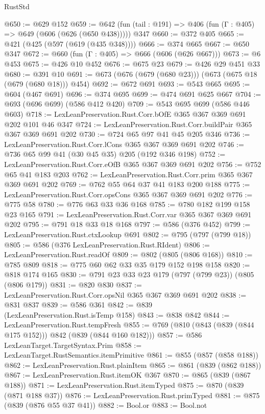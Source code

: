 \begin{lexlean}{RustStd}
\begin{coremodule}
@650 := @629 @152
@659 := @642 (fun (tail : @191) => @406 (fun (Γ : @405) => @649 (@606 (@626 (@650 @438))))) @347
@660 := @372 @405
@665 := @421 (@425 (@597 (@619 (@435 @348))))
@666 := @374 @665
@667 := @650 @347
@672 := @660 (fun (Γ : @405) => @666 (@606 (@626 @667)))
@673 := @6 @453
@675 := @426 @10 @452
@676 := @675 @23
@679 := @426 @29 @451 @33
@680 := @391 @10
@691 := @673 (@676 (@679 (@680 @23))) (@673 (@675 @18 (@679 (@680 @18))) @454)
@692 := @672 @691
@693 := @543 @665
@695 := @604 (@467 @691)
@696 := @374 @695
@699 := @474 @691 @625 @667
@704 := @693 (@696 @699) (@586 @412 @420)
@709 := @543 @695 @699 (@586 @446 @603)
@718 := LexLeanPreservation.Rust.Corr.bOfE @365 @367 @369 @691 @202 @101 @46 @347
@724 := LexLeanPreservation.Rust.Corr.buildPair @365 @367 @369 @691 @202
@730 := @724 @65 @97 @41 @45 @205 @346
@736 := LexLeanPreservation.Rust.Corr.lCons @365 @367 @369 @691 @202
@746 := @736 @65 @99 @41 (@30 @45 @35) @205 (@192 @346 @198)
@752 := LexLeanPreservation.Rust.Corr.eOfB @365 @367 @369 @691 @202
@756 := @752 @65 @41 @183 @203
@762 := LexLeanPreservation.Rust.Corr.prim @365 @367 @369 @691 @202
@769 := @762 @55 @64 @37 @41 @183 @200 @188
@775 := LexLeanPreservation.Rust.Corr.opsCons @365 @367 @369 @691 @202
@776 := @775 @58
@780 := @776 @63 @33 @36 @168
@785 := @780 @182 @199 @158 @23 @165
@791 := LexLeanPreservation.Rust.Corr.var @365 @367 @369 @691 @202
@795 := @791 @18 @33 @18 @168
@797 := @586 (@376 @452)
@799 := LexLeanPreservation.Rust.ctxLookup @691
@802 := @795 (@797 (@799 @18))
@805 := @586 (@376 LexLeanPreservation.Rust.RIdent)
@806 := LexLeanPreservation.Rust.readOf
@809 := @802 (@805 (@806 @168))
@810 := @785 @809
@818 := @775 @60 @62 @33 @35 @179 @152 @198 @158
@820 := @818 @174 @165
@830 := @791 @23 @33 @23 @179 (@797 (@799 @23)) (@805 (@806 @179))
@831 := @820 @830
@837 := LexLeanPreservation.Rust.Corr.opsNil @365 @367 @369 @691 @202
@838 := @831 @837
@839 := @586 @361
@842 := @839 (LexLeanPreservation.Rust.isTemp @158)
@843 := @838 @842
@844 := LexLeanPreservation.Rust.tempFresh
@855 := @769 (@810 (@843 (@839 (@844 @175 @152))) @842 (@839 (@844 @160 @182)))
@857 := @586 LexLeanTarget.TargetSyntax.Prim
@858 := LexLeanTarget.RustSemantics.itemPrimitive
@861 := @855 (@857 (@858 @188))
@862 := LexLeanPreservation.Rust.plainItem
@865 := @861 (@839 (@862 @188))
@867 := LexLeanPreservation.Rust.itemOK @367
@870 := @865 (@839 (@867 @188))
@871 := LexLeanPreservation.Rust.itemTyped
@875 := @870 (@839 (@871 @188 @37))
@876 := LexLeanPreservation.Rust.primTyped
@881 := @875 (@839 (@876 @55 @37 @41))
@882 := Bool.or
@883 := Bool.not

\end{coremodule}
\end{lexlean}
